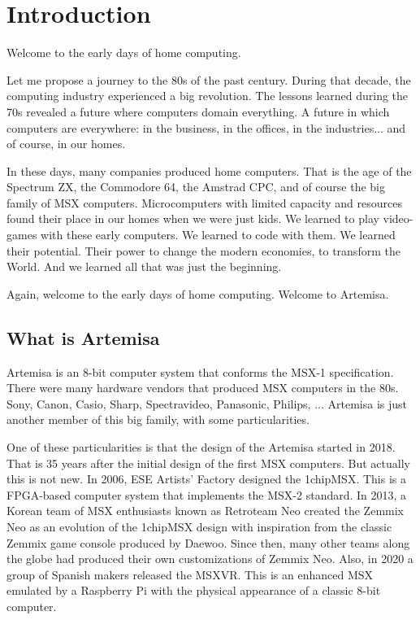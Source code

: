 \chapter{Introduction}

Welcome to the early days of home computing.

Let me propose a journey to the 80s of the past century. During that decade, the computing industry experienced a big revolution. The lessons learned during the 70s revealed a future where computers domain everything. A future in which computers are everywhere: in the business, in the offices, in the industries... and of course, in our homes.

In these days, many companies produced home computers. That is the age of the Spectrum ZX, the Commodore 64, the Amstrad CPC, and of course the big family of MSX computers. Microcomputers with limited capacity and resources  found their place in our homes when we were just kids. We learned to play video-games with these early computers. We learned to code with them. We learned their potential. Their power to change the modern economies, to transform the World. And we learned all that was just the beginning.

Again, welcome to the early days of home computing. Welcome to Artemisa.

\section{What is Artemisa}

Artemisa is an 8-bit computer system that conforms the MSX-1 specification. There were many hardware vendors that produced MSX computers in the 80s. Sony, Canon, Casio, Sharp, Spectravideo, Panasonic, Philips, ... Artemisa is just another member of this big family, with some particularities.

One of these particularities is that the design of the Artemisa started in 2018. That is 35 years after the initial design of the first MSX computers. But actually this is  not new. In 2006, ESE Artists’ Factory designed the 1chipMSX. This is a FPGA-based computer system that implements the MSX-2 standard. In 2013, a Korean team of MSX enthusiasts known as Retroteam Neo created the Zemmix Neo as an evolution of the 1chipMSX design with inspiration from the classic Zemmix game console produced by Daewoo. Since then, many other teams along the globe had produced their own customizations of Zemmix Neo. Also, in 2020 a group of Spanish makers released the MSXVR. This is an enhanced MSX emulated by a Raspberry Pi with the physical appearance of a classic 8-bit computer.


